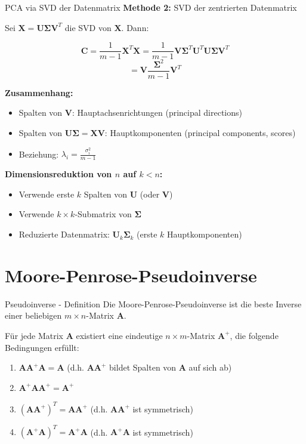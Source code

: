 \documentclass[a4paper, fontsize=7pt]{scrartcl}
\begin{document}
\begin{mainbox}{PCA via SVD der Datenmatrix}
\textbf{Methode 2:} SVD der zentrierten Datenmatrix

Sei $\mathbf{X} = \mathbf{U\Sigma V}^T$ die SVD von $\mathbf{X}$. Dann:

$$\mathbf{C} = \frac{1}{m-1}\mathbf{X}^T\mathbf{X} = \frac{1}{m-1}\mathbf{V\Sigma}^T\mathbf{U}^T\mathbf{U\Sigma V}^T$$
$$=\mathbf{V}\frac{\mathbf{\Sigma}^2}{m-1}\mathbf{V}^T$$

\textbf{Zusammenhang:}
\begin{itemize}
    \item Spalten von $\mathbf{V}$: Hauptachsenrichtungen (principal directions)
    \item Spalten von $\mathbf{U\Sigma} = \mathbf{XV}$: Hauptkomponenten (principal components, scores)
    \item Beziehung: $\lambda_i = \frac{\sigma_i^2}{m-1}$
\end{itemize}

\textbf{Dimensionsreduktion von $n$ auf $k < n$:}
\begin{itemize}
    \item Verwende erste $k$ Spalten von $\mathbf{U}$ (oder $\mathbf{V}$)
    \item Verwende $k \times k$-Submatrix von $\mathbf{\Sigma}$
    \item Reduzierte Datenmatrix: $\mathbf{U}_k\mathbf{\Sigma}_k$ (erste $k$ Hauptkomponenten)
\end{itemize}
\end{mainbox}

\section{Moore-Penrose-Pseudoinverse}

\begin{mainbox}{Pseudoinverse - Definition}
Die Moore-Penrose-Pseudoinverse ist die beste Inverse einer beliebigen $m \times n$-Matrix $\mathbf{A}$.

Für jede Matrix $\mathbf{A}$ existiert eine eindeutige $n \times m$-Matrix $\mathbf{A}^+$, die folgende Bedingungen erfüllt:

\begin{enumerate}
    \item $\mathbf{AA}^+\mathbf{A} = \mathbf{A}$ (d.h. $\mathbf{AA}^+$ bildet Spalten von $\mathbf{A}$ auf sich ab)
    \item $\mathbf{A}^+\mathbf{AA}^+ = \mathbf{A}^+$
    \item $(\mathbf{AA}^+)^T = \mathbf{AA}^+$ (d.h. $\mathbf{AA}^+$ ist symmetrisch)
    \item $(\mathbf{A}^+\mathbf{A})^T = \mathbf{A}^+\mathbf{A}$ (d.h. $\mathbf{A}^+\mathbf{A}$ ist symmetrisch)
\end{enumerate}
\end{mainbox}
\end{document}
